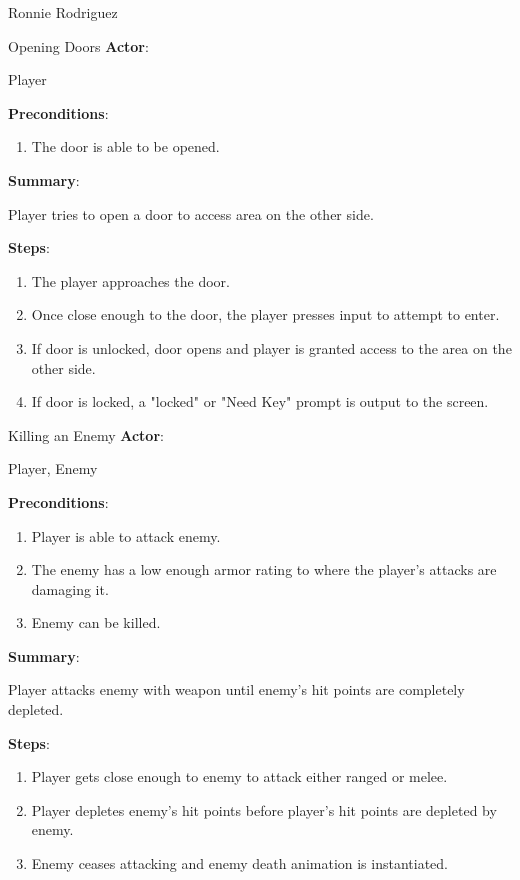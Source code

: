 \documentclass[12pt]{report}
\begin{document}
\begin{section}{Ronnie Rodriguez}
\begin{subsection}{Opening Doors}
\textbf{Actor}:

Player

\textbf{Preconditions}:

\begin{enumerate}
\item The door is able to be opened.
\end{enumerate}

\textbf{Summary}:

Player tries to open a door to access area on the other side. 

\textbf{Steps}:

\begin{enumerate}
\item The player approaches the door.
\item Once close enough to the door, the player presses input to attempt to
enter.
\item If door is unlocked, door opens and player is granted access to the
area on the other side.
\item If door is locked, a "locked" or "Need Key" prompt is output to the
screen.
\end{enumerate}
\end{subsection}

\begin{subsection}{Killing an Enemy}
\textbf{Actor}:

Player, Enemy

\textbf{Preconditions}:

\begin{enumerate}
\item Player is able to attack enemy.
\item The enemy has a low enough armor rating to where the player's attacks
are damaging it.
\item Enemy can be killed.
\end{enumerate}

\textbf{Summary}:

Player attacks enemy with weapon until enemy's hit points are
completely depleted.

\textbf{Steps}:

\begin{enumerate}
\item Player gets close enough to enemy to attack either ranged or melee.
\item Player depletes enemy's hit points before player's hit points are
depleted by enemy.
\item Enemy ceases attacking and enemy death animation is instantiated.
\end{enumerate}
\end{subsection}


\end{section}
\end{document}
